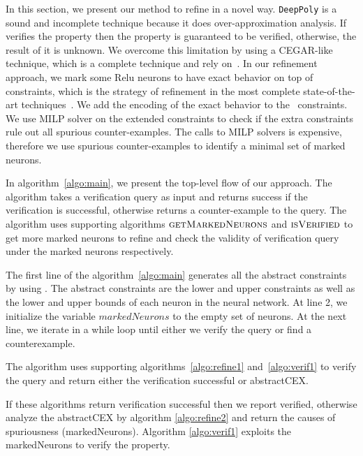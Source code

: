 In this section, we present our method to refine \deeppoly in a novel way.
%
\texttt{DeepPoly} is a sound and incomplete technique because it does over-approximation analysis. 
If \deeppoly{} verifies the property then the property is guaranteed to be verified, otherwise, the
result of it is unknown. 
We overcome this limitation by using a CEGAR-like technique, which is a complete technique
and rely on~\deeppoly{}. 
In our refinement approach, we mark some Relu neurons to have exact behavior on top
of~\deeppoly{} constraints, which is the strategy of refinement in the most complete
state-of-the-art techniques~\cite{alphabeta,etc}.
We add the encoding of the exact behavior to the~\deeppoly{} constraints.
%
We use MILP solver on the extended constraints to
check if the extra constraints rule out all spurious counter-examples.
%
The calls to MILP solvers is expensive,
therefore
we use spurious counter-examples to identify a minimal set of marked neurons.


In algorithm~\ref{algo:main}, we present the top-level flow of our approach.
The algorithm takes a verification query as input and returns
success if the verification is successful, otherwise
returns a counter-example to the query.
The algorithm uses supporting algorithms $\textsc{getMarkedNeurons}$ and
$\textsc{isVerified}$ to
get more marked neurons to refine and check the validity of verification query under
the marked neurons respectively.

The first line of the algorithm~\ref{algo:main} generates all the abstract constraints
by using \deeppoly{}.
The abstract constraints are the lower and upper constraints as well as the lower and upper bounds 
of each neuron in the neural network.
%
At line 2, we initialize the variable $markedNeurons$ to the empty set of neurons.
%
At the next line, we iterate in a while loop until either we verify the query or
find a counterexample.


%
The algorithm uses supporting algorithms~\ref{algo:refine1} and~\ref{algo:verif1} to
verify the query and return either the verification successful or abstractCEX. 



If these algorithms return verification successful then we report verified,
otherwise analyze the abstractCEX by algorithm \ref{algo:refine2} and return the causes of spuriousness (markedNeurons). 
Algorithm \ref{algo:verif1} exploits the markedNeurons to verify the property. 

